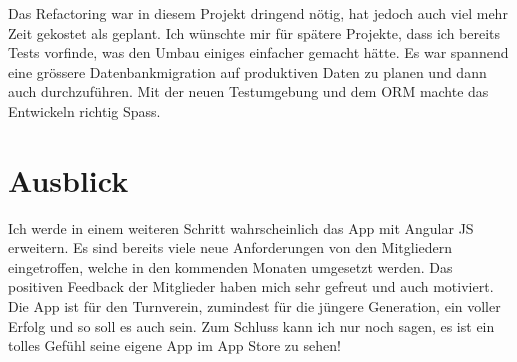 Das Refactoring war in diesem Projekt dringend nötig, hat jedoch auch viel mehr Zeit gekostet als geplant. Ich wünschte mir für spätere Projekte, dass ich bereits Tests vorfinde, was den Umbau einiges einfacher gemacht hätte. Es war spannend eine grössere Datenbankmigration auf produktiven Daten zu planen und dann auch durchzuführen. Mit der neuen Testumgebung und dem ORM machte das Entwickeln richtig Spass.\\

\section{Ausblick}\label{fazit_ausblick}
Ich werde in einem weiteren Schritt wahrscheinlich das App mit Angular JS erweitern. Es sind bereits viele neue Anforderungen von den Mitgliedern eingetroffen, welche in den kommenden Monaten umgesetzt werden. Das positiven Feedback der Mitglieder haben mich sehr gefreut und auch motiviert. Die App ist für den Turnverein, zumindest für die jüngere Generation, ein voller Erfolg und so soll es auch sein. Zum Schluss kann ich nur noch sagen, es ist ein tolles Gefühl seine eigene App im App Store zu sehen!